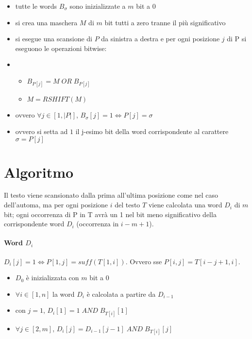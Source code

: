 \begin{itemize}
    \item tutte le words $B_\sigma$ sono inizializzate a $m$ bit a 0
    \item si crea una maschera $M$ di $m$ bit tutti a zero tranne il pi\`u significativo
    \item si esegue una scansione di $P$ da sinistra a destra e per ogni posizione $j$ di P si eseguono le operazioni bitwise:
    \item \begin{itemize}
        \item $B_{P[j]} = M \; OR \; B_{P[j]}$
        \item $M = RSHIFT(M)$
    \end{itemize}
    \item ovvero $\forall j \in [1, |P|]$, $B_\sigma[j] = 1 \Leftrightarrow P[j] = \sigma$
    \item ovvero si setta ad $1$ il j-esimo bit della word corrispondente al carattere $\sigma = P[j]$
\end{itemize}


\section{Algoritmo}

Il testo viene scansionato dalla prima all'ultima posizione come nel caso dell'automa, ma per ogni posizione $i$ del testo $T$ viene calcolata una word $D_i$ di $m$ bit; ogni occorrenza di P in T avr\`a un 1 nel bit meno significativo della corrispondente word $D_i$ (occorrenza in $i-m+1$).

\paragraph{Word $D_i$} $D_i[j] = 1 \Leftrightarrow P[1,j] = suff(T[1,i])$. Ovvero sse $P[i,j] = T[i-j+1, i]$.


\begin{itemize}
    \item $D_0$ \`e inizializzata con $m$ bit a 0
    \item $\forall i \in [1,n]$ la word $D_i$ \`e calcolata a partire da $D_{i-1}$
    \item con $j = 1$, $D_{i}[1] = 1 \; AND \; B_{T[i]}[1]$
    \item $\forall j \in [2,m]$, $D_i[j] = D_{i-1}[j-1] \; AND \; B_{T[i]}[j]$
\end{itemize}

